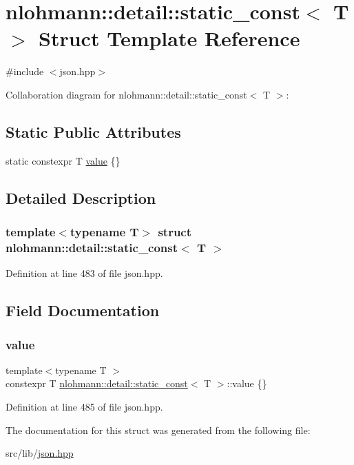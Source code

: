 \hypertarget{structnlohmann_1_1detail_1_1static__const}{}\section{nlohmann\+:\+:detail\+:\+:static\+\_\+const$<$ T $>$ Struct Template Reference}
\label{structnlohmann_1_1detail_1_1static__const}


{\ttfamily \#include $<$json.\+hpp$>$}



Collaboration diagram for nlohmann\+:\+:detail\+:\+:static\+\_\+const$<$ T $>$\+:
\subsection*{Static Public Attributes}
\begin{DoxyCompactItemize}
\item 
static constexpr T \hyperlink{structnlohmann_1_1detail_1_1static__const_a6bb7ab2ddd6abc41fb4ffb7c6dfa237e}{value} \{\}
\end{DoxyCompactItemize}


\subsection{Detailed Description}
\subsubsection*{template$<$typename T$>$\newline
struct nlohmann\+::detail\+::static\+\_\+const$<$ T $>$}



Definition at line 483 of file json.\+hpp.



\subsection{Field Documentation}
\mbox{\label{structnlohmann_1_1detail_1_1static__const_a6bb7ab2ddd6abc41fb4ffb7c6dfa237e}} 
\subsubsection{\texorpdfstring{value}{value}}
{\footnotesize\ttfamily template$<$typename T $>$ \\
constexpr T \hyperlink{structnlohmann_1_1detail_1_1static__const}{nlohmann\+::detail\+::static\+\_\+const}$<$ T $>$\+::value \{\}\hspace{0.3cm}{\ttfamily [static]}}



Definition at line 485 of file json.\+hpp.



The documentation for this struct was generated from the following file\+:\begin{DoxyCompactItemize}
\item 
src/lib/\hyperlink{json_8hpp}{json.\+hpp}\end{DoxyCompactItemize}
